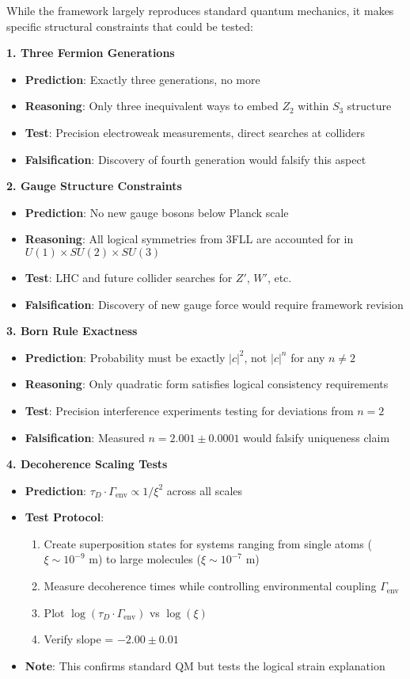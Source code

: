 \documentclass[12pt,a4paper]{article}
\begin{document}
While the framework largely reproduces standard quantum mechanics, it makes specific structural constraints that could be tested:

\textbf{1. Three Fermion Generations}
\begin{itemize}
\item \textbf{Prediction}: Exactly three generations, no more
\item \textbf{Reasoning}: Only three inequivalent ways to embed $Z_2$ within $S_3$ structure
\item \textbf{Test}: Precision electroweak measurements, direct searches at colliders
\item \textbf{Falsification}: Discovery of fourth generation would falsify this aspect
\end{itemize}

\textbf{2. Gauge Structure Constraints}
\begin{itemize}
\item \textbf{Prediction}: No new gauge bosons below Planck scale
\item \textbf{Reasoning}: All logical symmetries from 3FLL are accounted for in $U(1) \times SU(2) \times SU(3)$
\item \textbf{Test}: LHC and future collider searches for $Z'$, $W'$, etc.
\item \textbf{Falsification}: Discovery of new gauge force would require framework revision
\end{itemize}

\textbf{3. Born Rule Exactness}
\begin{itemize}
\item \textbf{Prediction}: Probability must be exactly $|c|^2$, not $|c|^n$ for any $n \neq 2$
\item \textbf{Reasoning}: Only quadratic form satisfies logical consistency requirements
\item \textbf{Test}: Precision interference experiments testing for deviations from $n = 2$
\item \textbf{Falsification}: Measured $n = 2.001 \pm 0.0001$ would falsify uniqueness claim
\end{itemize}

\textbf{4. Decoherence Scaling Tests}
\begin{itemize}
\item \textbf{Prediction}: $\tau_D \cdot \Gamma_{\text{env}} \propto 1/\xi^2$ across all scales
\item \textbf{Test Protocol}:
\begin{enumerate}
\item Create superposition states for systems ranging from single atoms ($\xi \sim 10^{-9}$ m) to large molecules ($\xi \sim 10^{-7}$ m)
\item Measure decoherence times while controlling environmental coupling $\Gamma_{\text{env}}$
\item Plot $\log(\tau_D \cdot \Gamma_{\text{env}})$ vs $\log(\xi)$
\item Verify slope = $-2.00 \pm 0.01$
\end{enumerate}
\item \textbf{Note}: This confirms standard QM but tests the logical strain explanation
\end{itemize}
\end{document}

